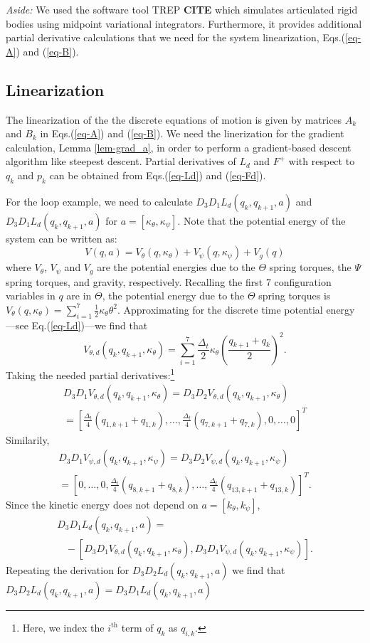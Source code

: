 \documentclass[letterpaper, 10pt, conference]{ieeeconf}
\begin{document}
\emph{Aside:}  We used the software tool TREP \textbf{CITE} which simulates articulated rigid bodies using midpoint variational integrators.  Furthermore, it provides additional partial derivative calculations that we need for the system linearization, Eqs.(\ref{eq-A}) and (\ref{eq-B}).  

\subsection{Linearization}
The linearization of the the discrete equations of motion is given by matrices $A_k$ and $B_k$ in Eqs.(\ref{eq-A}) and (\ref{eq-B}).  We need the linerization for the gradient calculation, Lemma \ref{lem-grad_a}, in order to perform a gradient-based descent algorithm like steepest descent.  Partial derivatives of $L_d$ and $F^+$ with respect to $q_k$ and $p_k$ can be obtained from Eqs.(\ref{eq-Ld}) and (\ref{eq-Fd}).

For the loop example, we need to calculate $D_3D_1L_d(q_k,q_{k+1},a)$ and $D_3D_1L_d(q_k,q_{k+1},a)$ for $a = [\kappa_\theta, \kappa_\psi]$.  Note that the potential energy of the system can be written as:
\[
V(q,a) = V_{\theta}(q,\kappa_{\theta}) + V_{\psi}(q,\kappa_{\psi}) + V_g(q)
\]
where $V_{\theta}$, $V_{\psi}$ and $V_g$ are the potential energies due to the $\Theta$ spring torques, the $\Psi$ spring torques, and gravity, respectively.  Recalling the first 7 configuration variables in $q$ are in $\Theta$, the potential energy due to the $\Theta$ spring torques is $V_{\theta}(q, \kappa_{\theta}) = \sum_{i = 1}^{7}\frac{1}{2}\kappa_{\theta}\theta^2$.  Approximating for the discrete time potential energy---see Eq.(\ref{eq-Ld})---we find that
\[
V_{\theta,d}(q_k,q_{k+1},\kappa_{\theta}) = \sum_{i=1}^7\frac{\Delta_t}{2}\kappa_{\theta}(\frac{q_{k+1} + q_k}{2})^2.
\]
Taking the needed partial derivatives:\footnote{Here, we index the $i^\textrm{th}$ term of $q_k$ as $q_{i,k}$.}
\[
\begin{array}{l}
D_3D_1 V_{\theta,d}(q_k,q_{k+1},\kappa_{\theta}) = D_3D_2 V_{\theta,d}(q_k,q_{k+1},\kappa_{\theta}) \\= [\frac{\Delta_t}{4}(q_{1,k+1} + q_{1,k}) , \ldots , \frac{\Delta_t}{4}(q_{7,k+1} + q_{7,k}), 0 ,\ldots, 0]^T
\end{array}
\]
Similarily, 
\[
\begin{array}{l}
D_3D_1 V_{\psi,d}(q_k,q_{k+1},\kappa_{\psi}) = D_3D_2 V_{\psi,d}(q_k,q_{k+1},\kappa_{\psi}) \\= [0,\ldots,0,\frac{\Delta_t}{4}(q_{8,k+1} + q_{8,k}) , \ldots , \frac{\Delta_t}{4}(q_{13,k+1} + q_{13,k})]^T.
\end{array}
\]
Since the kinetic energy does not depend on $a = [k_\theta, k_\psi]$,
\[
\begin{array}{l}
D_3D_1L_d(q_k,q_{k+1},a) = \\\hspace{10pt}- [D_3D_1 V_{\theta,d}(q_k,q_{k+1},\kappa_{\theta}), D_3D_1 V_{\psi,d}(q_k,q_{k+1},\kappa_{\psi})].
\end{array}
\]
Repeating the derivation for $D_3D_2L_d(q_k,q_{k+1},a)$ we find that $D_3D_2L_d(q_k,q_{k+1},a) = D_3D_1L_d(q_k,q_{k+1},a)$
\end{document}
